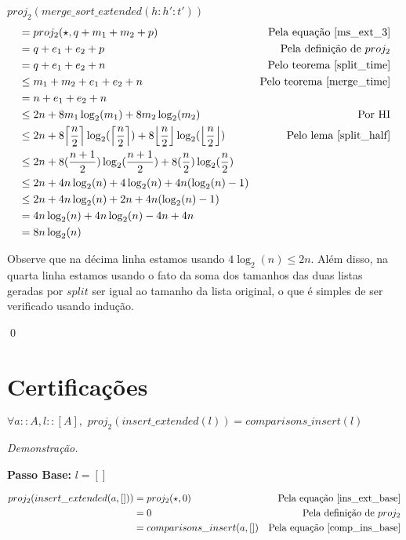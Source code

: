 \documentclass[12pt, oneside, a4paper,english,brazil]{abntex2}
\DeclarePairedDelimiter\floor{\lfloor}{\rfloor}
\DeclarePairedDelimiter\ceil{\lceil}{\rceil}
\begin{document}
$proj_{2}(merge\_sort\_extended(h : h' : t'))$
\begin{align*}
  &= proj_{2}(\star, q + m_{1} + m_{2} + p) &\text{Pela equa\c{c}\~ao \ref{ms_ext_3}}\\
  &= q + e_{1} + e_{2} + p &\text{Pela defini\c{c}\~ao de $proj_{2}$}\\
  &= q + e_{1} + e_{2} + n &\text{Pelo teorema \ref{split_time}}\\
  &\le m_{1} + m_{2} + e_{1} + e_{2} + n &\text{Pelo teorema \ref{merge_time}}\\
  &= n + e_{1} + e_{2} + n\\
  &\le 2n + 8m_{1}\log_{2}(m_{1}) + 8m_{2}\log_{2}(m_{2}) &\text{Por HI}\\
  &\le 2n + 8\ceil*{\frac{n}{2}}\log_{2}(\ceil*{\frac{n}{2}}) + 8\floor*{\frac{n}{2}}\log_{2}(\floor*{\frac{n}{2}}) &\text{Pelo lema \ref{split_half}}\\
  &\le 2n + 8(\frac{n + 1}{2})\log_{2}(\frac{n + 1}{2}) + 8(\frac{n}{2})\log_{2}(\frac{n}{2}) \\
  &\le 2n + 4n\log_{2}(n) + 4\log_{2}(n) + 4n(\log_{2}(n) - 1)\\
  &\le 2n + 4n\log_{2}(n) + 2n + 4n(\log_{2}(n) - 1)\\
  &= 4n\log_{2}(n) + 4n\log_{2}(n) - 4n + 4n\\
  &= 8n\log_{2}(n)
\end{align*}

Observe que na d\'ecima linha estamos usando $4\log_{2}(n) \le 2n$. Al\'em disso, na quarta linha estamos usando o fato da soma dos tamanhos das duas listas geradas por $split$ ser igual ao tamanho da lista original, o que \'e simples de ser verificado usando indu\c{c}\~ao.

\qed

\section{Certifica\c{c}\~oes}

\begin{teorema}
  $\forall a :: A, l :: [A], \,\, proj_{2}(insert\_extended(l)) = comparisons\_insert(l)$
\end{teorema}

\noindent \textit{Demonstra\c{c}\~ao.}

\textbf{Passo Base: } $l = []$

\begin{align*}
  proj_{2}(insert\_extended(a, [])) &= proj_{2}(\star, 0) &\text{Pela equa\c{c}\~ao \ref{ins_ext_base}}\\
                                 &= 0 &\text{Pela defini\c{c}\~ao de } proj_{2} \\
  &= comparisons\_insert(a, []) &\text{Pela equa\c{c}\~ao \ref{comp_ins_base}}
\end{align*}
\end{document}
